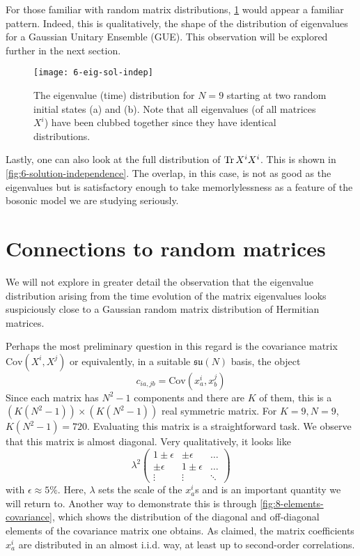 For those familiar with random matrix distributions, \cref{fig:6-eig-sol-indep} would appear a familiar pattern. Indeed, this is qualitatively, the shape of the distribution of eigenvalues for a Gaussian Unitary Ensemble (GUE). This observation will be explored further in the next section.

\begin{figure}[H]
    \centering
    \texttt{[image: 6-eig-sol-indep]}
    \caption{The eigenvalue (time) distribution for $N = 9$ starting at two random initial states (a) and (b). Note that all eigenvalues (of all matrices $X^i$) have been clubbed together since they have identical distributions.}
    \label{fig:6-eig-sol-indep}
\end{figure}

Lastly, one can also look at the full distribution of $\Tr X^i X^i$. This is shown in \cref{fig:6-solution-independence}. The overlap, in this case, is not as good as the eigenvalues but is satisfactory enough to take memorlylessness as a feature of the bosonic model we are studying seriously.  

\section{Connections to random matrices}
We will not explore in greater detail the observation that the eigenvalue distribution arising from the time evolution of the matrix eigenvalues looks suspiciously close to a Gaussian random matrix distribution of Hermitian matrices.

Perhaps the most preliminary question in this regard is the covariance matrix $\mathrm{Cov}(X^i, X^j)$ or equivalently, in a suitable $\mathfrak{su}(N)$ basis, the object
\begin{equation}
    c_{i a, j b} = \mathrm{Cov} \left( x^i_a , x^j_b \right)
\end{equation}
Since each matrix has $N^2 - 1$ components and there are $K$ of them, this is a $(K(N^2-1)) \times (K(N^2-1))$ real symmetric matrix. For $K = 9, N = 9$, $K(N^2-1) = 720$. Evaluating this matrix is a straightforward task. We observe that this matrix is almost diagonal. Very qualitatively, it looks like
\begin{equation}
    \lambda^2 \begin{pmatrix}
        1 \pm \epsilon & \pm \epsilon & \ldots \\
        \pm \epsilon & 1 \pm \epsilon & \ldots \\
        \vdots & \vdots & \ddots
    \end{pmatrix}
\end{equation}
with $\epsilon \approx 5\%$. Here, $\lambda$ sets the scale of the $x^{i}_{a}$s and is an important quantity we will return to. Another way to demonstrate this is through \cref{fig:8-elements-covariance}, which shows the distribution of the diagonal and off-diagonal elements of the covariance matrix one obtains. As claimed, the matrix coefficients $x^{i}_{a}$ are distributed in an almost i.i.d. way, at least up to second-order correlations.

